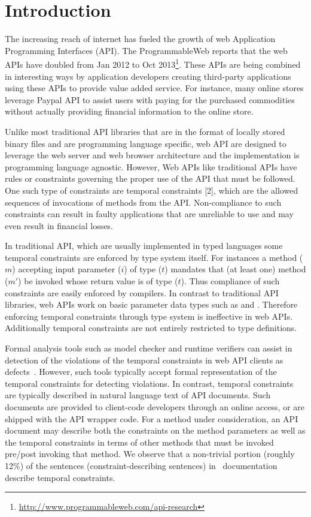 \section{Introduction}
\label{sec:introduction}

The increasing reach of internet has fueled the growth of web Application Programming Interfaces (API).
The ProgrammableWeb reports that the web APIs have doubled from Jan 2012 to Oct 2013\footnote{\url{http://www.programmableweb.com/api-research}}.
These APIs are being combined in interesting ways by application developers creating third-party applications using
these APIs to provide value added service.
For instance, many online stores leverage Paypal API to assist users with paying for the purchased commodities without actually
providing financial information to the online store.

Unlike most traditional API libraries that are in the format of locally stored binary files and are programming language specific,
web API are designed to leverage the web server and web browser architecture and the implementation is programming language agnostic.
However, Web APIs like traditional APIs have rules or constraints governing the proper  use of the API that must be followed.
One such type of constraints are temporal constraints [2], which are the allowed sequences of invocations of methods from the API.
Non-compliance to such constraints can result in faulty applications that are unreliable to use and may even result in financial losses.

In traditional API, which are usually implemented in typed languages some temporal constraints are enforced by type system itself.
For instances a method ($m$) accepting input parameter ($i$) of type ($t$) mandates
that (at least one) method ($m'$) be invoked whose return value is of type ($t$).
Thus compliance of such constraints are easily enforced by compilers.
In contrast to traditional API libraries, web APIs work on basic parameter data types such as  and .
Therefore enforcing temporal constraints through type system is ineffective in web APIs.
Additionally temporal constraints are not entirely restricted to type definitions.

Formal analysis tools such as model checker and runtime verifiers can assist in detection of the violations of the temporal constraints in web API clients as defects~\cite{lee2012towards}.
However, such tools typically accept formal representation of the temporal constraints for detecting violations.
In contrast, temporal constraints are typically described in natural language text of API documents.
Such documents are provided to client-code developers through an online access, or are shipped with the API wrapper code.
For a method under consideration, an API document may describe both the constraints on the method parameters
as well as the temporal constraints in terms of other methods that must be invoked pre/post invoking that method.
We observe that a non-trivial portion (roughly 12\%) of the sentences (constraint-describing sentences)
in \amazonAPI\ documentation describe temporal constraints.


